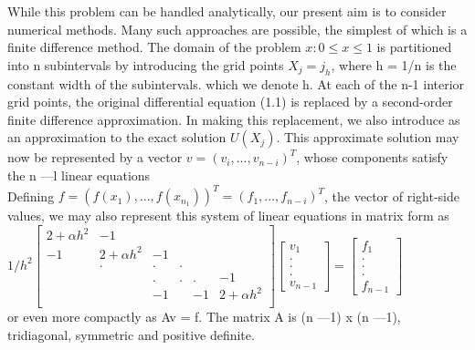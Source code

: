 While this problem can be handled analytically, our present aim is to consider numerical methods. Many such approaches are possible, the simplest of which is a finite difference method. The domain of the problem ${x : 0\leq x\leq 1}$ is partitioned into n subintervals by introducing the grid points $X_j = j_h$, where h = 1/n is the constant width of the subintervals. which we denote h.
	At each of the n-1 interior grid points, the original differential equation (1.1) is replaced by a second-order finite difference approximation. In making this replacement, we also introduce as an approximation to the exact solution $U(X_j)$. This approximate solution may now be represented by a vector $v = (v_i,..., v_{n-i})^T$, whose components satisfy the n —l linear equations\\
	Defining $f=(f(x_1),...,f(x_{n_1}))^T =(f_1,...,f_{n-i})^T$, the vector of right-side values, we may also represent this system of linear equations in matrix form as\\
	$1/h^2
	\begin{bmatrix}
		2+\alpha h^2 & -1 & & & &\\
		-1 & 2+\alpha h^2 & -1 & & &\\
		&. & . & . & & \\
		& &. & . & . &  -1 \\
		 & & -1 & & -1 &2+\alpha h^2\\
	\end{bmatrix}
	\begin{bmatrix}
		v_1\\
		.\\
		.\\
		.\\
		v_{n-1}
	\end{bmatrix} = 
	\begin{bmatrix}
		f_1\\
		.\\
		.\\
		.\\
		f_{n-1}
	\end{bmatrix}$\\
	or even more compactly as Av = f. The matrix A is (n —1) x (n —1), tridiagonal, symmetric and positive definite.\\
